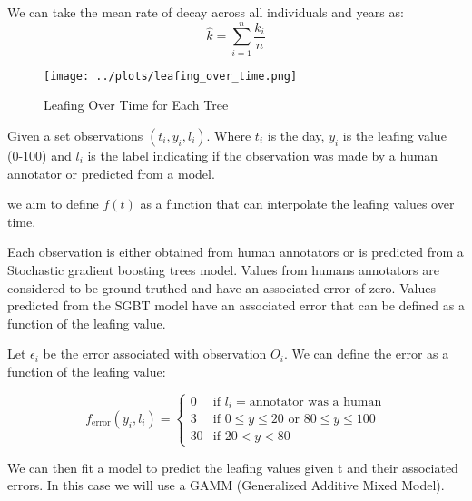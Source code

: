 \documentclass{article}
\begin{document}
We can take the mean rate of decay across all individuals and years as:
\begin{equation}
    \hat{k} = \sum_{i=1}^{n} \frac{k_i}{n}
\end{equation}    

\begin{figure}[h]
    \centering
    \texttt{[image: ../plots/leafing\_over\_time.png]}
    \caption{Leafing Over Time for Each Tree}
\end{figure}

Given a set observations $(t_i, y_i, l_i)$. Where $t_i$ is the day, $y_i$ is the leafing value (0-100) and $l_i$ is the label indicating if the observation was made by a human annotator or predicted from a model.

we aim to define $f(t)$ as a function that can interpolate the leafing values over time.

Each observation is either obtained from human annotators or is predicted from a Stochastic gradient boosting trees model. 
Values from humans annotators are considered to be ground truthed and have an associated error of zero.
Values predicted from the SGBT model have an associated error that can be defined as a function of the leafing value.

Let $\epsilon_i$ be the error associated with observation $O_i$. We can define the error as a function of the leafing value:

\begin{equation}
    f_{\text{error}}(y_i, l_i) = 
    \begin{cases}
        0 & \text{if } l_i = \text{annotator was a human} \\
        3 & \text{if } 0 \leq y \leq 20 \text{ or } 80 \leq y \leq 100 \\
        30 & \text{if } 20 < y < 80
    \end{cases}
\end{equation}

We can then fit a model to predict the leafing values given t and their associated errors.
In this case we will use a GAMM (Generalized Additive Mixed Model).
\end{document}
